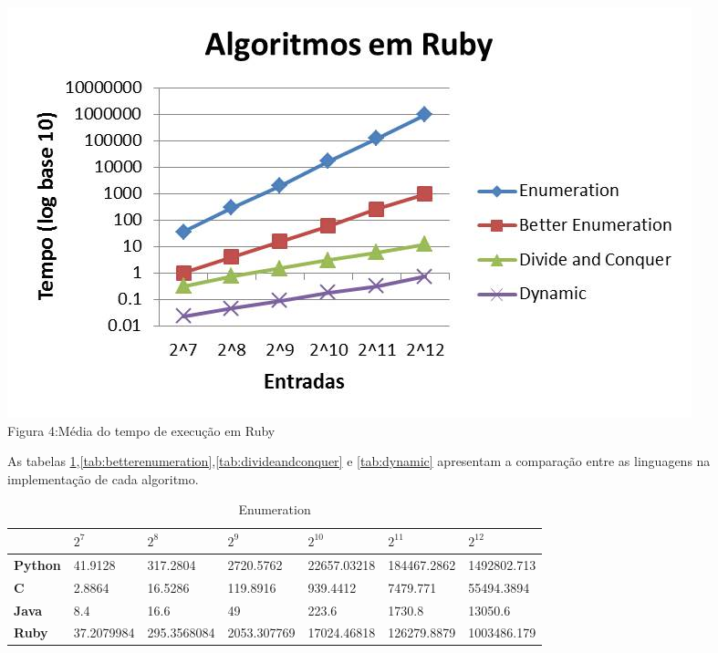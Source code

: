 \documentclass[
	12pt,				%
	oneside,   	        %
	a4paper,			%
	english,			%
	french,				%
	spanish,			%
	brazil,				%
	]{pacotes/abntex2}
\begin{document}
\begin{center}
    \includegraphics[scale=0.9]{figuras/ruby.jpg}\\
    \caption{Figura 4:Média do tempo de execução em Ruby}
\end{center}



As tabelas \ref{tab:enumeration},\ref{tab:betterenumeration},\ref{tab:divideandconquer} e \ref{tab:dynamic} apresentam a comparação entre as linguagens na implementação de cada algoritmo.

\begin{table}[!htb]
\centering
\caption{Enumeration}
\label{tab:enumeration}
\footnotesize   %
\begin{tabular}{l|llllll}
\toprule
& \textbf{$2^7$} & \textbf{$2^8$} & \textbf{$2^9$} & \textbf{$2^{10}$} & \textbf{$2^{11}$} & \textbf{$2^{12}$}\\ 
\midrule
\textbf{Python} &  41.9128 & 317.2804 & 2720.5762 & 22657.03218 & 184467.2862 & 1492802.713 \\
\textbf{C} & 2.8864 & 16.5286 & 119.8916 & 939.4412 & 7479.771 & 55494.3894 \\
\textbf{Java} & 8.4 & 16.6 & 49 & 223.6 & 1730.8 & 13050.6 \\
\textbf{Ruby} &  37.2079984 & 295.3568084 & 2053.307769 & 17024.46818 & 126279.8879 & 1003486.179\\
 \bottomrule
\end{tabular}
\end{table}
\end{document}
